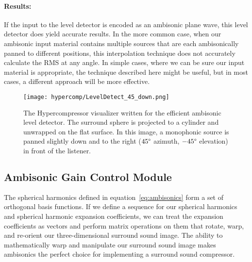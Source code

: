 \paragraph{Results:}If the input to the level detector is encoded as
an ambisonic plane wave, this level detector does yield accurate
results.  In the more common case, when our ambisonic input material
contains multiple sources that are each ambisonically panned to
different positions, this interpolation technique does not accurately
calculate the RMS at any angle. In simple cases, where we can be sure
our input material is appropriate, the technique described here might
be useful, but in most cases, a different approach will be more
effective.

\begin{figure}[h]
  \texttt{[image: hypercomp/LevelDetect\_45\_down.png]}
  \caption{The Hypercompressor visualizer written for the efficient
    ambisonic level detector. The surround sphere is projected to a
    cylinder and unwrapped on the flat surface. In this image, a
    monophonic source is panned slightly down and to the right
    ($45\degree$ azimuth, $-45\degree$ elevation) in front of the
    listener.}
  \label{fig:hypercomp-inf-map-angle}
\end{figure}

\subsection{Ambisonic Gain Control Module}
\label{sec:ambis-gain-contr}
 The spherical
harmonics defined in equation~\ref{eq:ambisonics} form a set of
orthogonal basis functions. If we define a sequence for our spherical
harmonics and spherical harmonic expansion coefficients, we can treat
the expansion coefficients as vectors and perform matrix operations
on them that rotate, warp, and re-orient our three-dimensional
surround sound image.\cite{Anderson2009} The ability to
mathematically warp and manipulate our surround sound image makes
ambisonics the perfect choice for implementing a surround sound
compressor.


